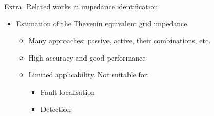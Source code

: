\documentclass[../main.tex]{subfiles}
\begin{document}
\begin{frame}[t]{Extra. Related works in impedance identification}
\begin{itemize}
\item Estimation of the Thevenin equivalent grid impedance
\begin{itemize}
\item Many approaches: passive, active, their combinations, etc.
\item High accuracy and good performance
\item Limited applicability. Not suitable for:
\begin{itemize}
\item Fault localisation
\item Detection
\end{itemize}
\end{itemize}
\end{itemize}

\begin{figure}[H]
\end{figure}

\end{frame}
\end{document}
